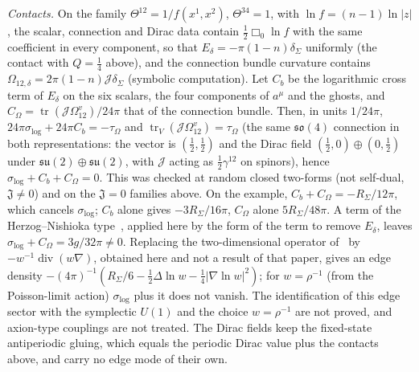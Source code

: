 \emph{Contacts.} On the family \(\Theta^{12}=1/f(x^1,x^2)\), \(\Theta^{34}=1\), with \(\ln f=(n-1)\ln|z|\), the scalar, connection and Dirac data contain \(\tfrac12\Box_0\ln f\) with the same coefficient in every component, so that \(E_\delta=-\pi(1-n)\delta_\Sigma\) uniformly (the contact with \(Q=\tfrac14\) above), and the connection bundle curvature contains \(\Omega_{12,\delta}=2\pi(1-n)\mathcal J\delta_\Sigma\) (symbolic computation). Let \(C_b\) be the logarithmic cross term of \(E_\delta\) on the six scalars, the four components of \(a^\mu\) and the ghosts, and \(C_\Omega=\operatorname{tr}(\mathcal J\Omega^{v}_{12})/24\pi\) that of the connection bundle. Then, in units \(1/24\pi\), \(24\pi\sigma_{\log}+24\pi C_b=-\tau_\Omega\) and \(\operatorname{tr}_V(\mathcal J\Omega^v_{12})=\tau_\Omega\) (the same \(\mathfrak{so}(4)\) connection in both representations: the vector is \((\tfrac12,\tfrac12)\) and the Dirac field \((\tfrac12,0)\oplus(0,\tfrac12)\) under \(\mathfrak{su}(2)\oplus\mathfrak{su}(2)\), with \(\mathcal J\) acting as \(\tfrac12\gamma^{12}\) on spinors), hence \(\sigma_{\log}+C_b+C_\Omega=0\). This was checked at random closed two-forms (not self-dual, \(\mathfrak J\neq0\)) and on the \(\mathfrak J=0\) families above. On the example, \(C_b+C_\Omega=-R_\Sigma/12\pi\), which cancels \(\sigma_{\log}\); \(C_b\) alone gives \(-3R_\Sigma/16\pi\), \(C_\Omega\) alone \(5R_\Sigma/48\pi\). A term of the Herzog--Nishioka type~\cite{HerzogNishioka2016}, applied here by the form of the term to remove \(E_\delta\), leaves \(\sigma_{\log}+C_\Omega=3g/32\pi\ne0\). Replacing the two-dimensional operator of~\cite{DonnellyWall2016} by \(-w^{-1}\operatorname{div}(w\nabla)\), obtained here and not a result of that paper, gives an edge density \(-(4\pi)^{-1}(R_\Sigma/6-\tfrac12\Delta\ln w-\tfrac14|\nabla\ln w|^2)\); for \(w=\rho^{-1}\) (from the Poisson-limit action) \(\sigma_{\log}\) plus it does not vanish. The identification of this edge sector with the symplectic \(U(1)\) and the choice \(w=\rho^{-1}\) are not proved, and axion-type couplings are not treated. The Dirac fields keep the fixed-state antiperiodic gluing, which equals the periodic Dirac value plus the contacts above, and carry no edge mode of their own.

